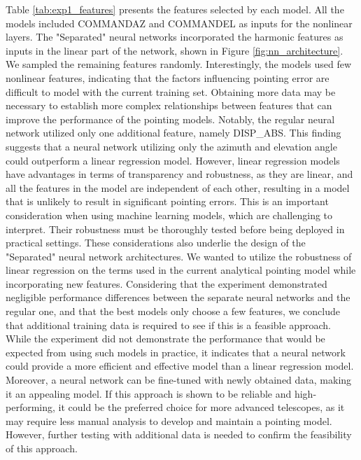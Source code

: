 Table \ref{tab:exp1_features} presents the features selected by each model.
All the models included COMMANDAZ and COMMANDEL as inputs for the nonlinear layers.
The "Separated" neural networks incorporated the harmonic features as inputs in the linear part of the network, shown in Figure \ref{fig:nn_architecture}.
We sampled the remaining features randomly.
Interestingly, the models used few nonlinear features, indicating that the factors influencing pointing error are difficult to model with the current training set.
Obtaining more data may be necessary to establish more complex relationships between features that can improve the performance of the pointing models.
Notably, the regular neural network utilized only one additional feature, namely DISP\_ABS.
This finding suggests that a neural network utilizing only the azimuth and elevation angle could outperform a linear regression model.
However, linear regression models have advantages in terms of transparency and robustness, as they are linear, and all the features in the model are independent of each other,
resulting in a model that is unlikely to result in significant pointing errors.
This is an important consideration when using machine learning models, which are challenging to interpret.
Their robustness must be thoroughly tested before being deployed in practical settings.
These considerations also underlie the design of the "Separated" neural network architectures.
We wanted to utilize the robustness of linear regression on the terms used in the current analytical pointing model while incorporating new features. 
Considering that the experiment demonstrated negligible performance differences between the separate neural networks and the regular
one, and that the best models only choose a few features, we conclude that additional training data is required to see if this is a feasible approach.\\

While the experiment did not demonstrate the performance that would be expected from using such models in practice,
it indicates that a neural network could provide a more efficient and effective model than a linear regression model.
Moreover, a neural network can be fine-tuned with newly obtained data, making it an appealing model.
If this approach is shown to be reliable and high-performing, it could be the preferred choice for more advanced telescopes, as it may require less manual analysis to develop and maintain a pointing model.
However, further testing with additional data is needed to confirm the feasibility of this approach.
